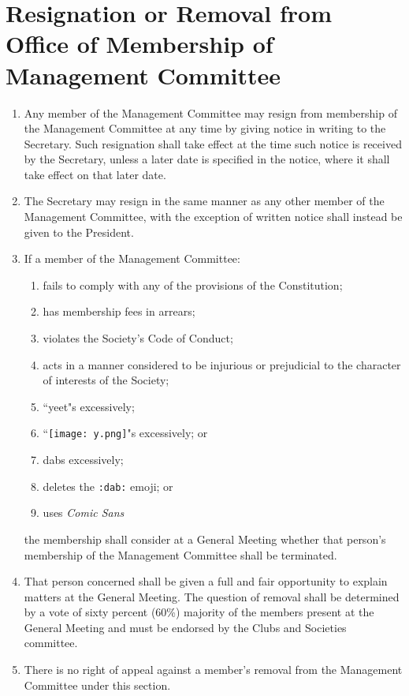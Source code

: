 \documentclass[a4paper]{article}
\begin{document}
\section{Resignation or Removal from Office of Membership of Management Committee}
\begin{enumerate}
\item Any member of the Management Committee may resign from membership of the Management Committee at any time by giving notice in writing to the Secretary. Such resignation shall take effect at the time such notice is received by the Secretary, unless a later date is specified in the notice, where it shall take effect on that later date.
\item The Secretary may resign in the same manner as any other member of the Management Committee, with the exception of written notice shall instead be given to the President.
\item If a member of the Management Committee:
	\begin{enumerate}
	\item fails to comply with any of the provisions of the Constitution;
	\item has membership fees in arrears;
	\item violates the Society's Code of Conduct;
	\item acts in a manner considered to be injurious or prejudicial to the character of interests of the Society;
	\item ``yeet"s excessively;
	\item ``\texttt{[image: y.png]}"s excessively; or
	\item dabs excessively;
	\item deletes the \texttt{:dab:} emoji; or
	\item uses \textit{Comic Sans}
	\end{enumerate}
the membership shall consider at a General Meeting whether that person's membership of the Management Committee shall be terminated.
\item That person concerned shall be given a full and fair opportunity to explain matters at the General Meeting. The question of removal shall be determined by a vote of sixty percent (60\%) majority of the members present at the General Meeting and must be endorsed by the Clubs and Societies committee.
\item There is no right of appeal against a member's removal from the Management Committee under this section.
\end{enumerate}
\end{document}
